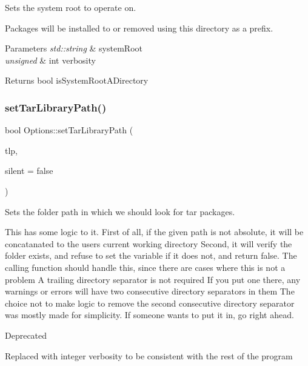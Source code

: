 Sets the system root to operate on. 

Packages will be installed to or removed using this directory as a prefix.


\begin{DoxyParams}{Parameters}
{\em std\+::string} & system\+Root \\
\hline
{\em unsigned} & int verbosity\\
\hline
\end{DoxyParams}
\begin{DoxyReturn}{Returns}
bool is\+System\+Root\+A\+Directory 
\end{DoxyReturn}
\mbox{\label{classOptions_a938d840685d739466bfb36759b7fcb43}} 
\subsubsection{\texorpdfstring{setTarLibraryPath()}{setTarLibraryPath()}\hspace{0.1cm}{\footnotesize\ttfamily [1/2]}}
{\footnotesize\ttfamily bool Options\+::set\+Tar\+Library\+Path (\begin{DoxyParamCaption}\item[{std\+::string}]{tlp,  }\item[{bool}]{silent = {\ttfamily false} }\end{DoxyParamCaption})}



Sets the folder path in which we should look for tar packages. 

This has some logic to it. First of all, if the given path is not absolute, it will be concatanated to the user\textquotesingle{}s current working directory Second, it will verify the folder exists, and refuse to set the variable if it does not, and return false. The calling function should handle this, since there are cases where this is not a problem A trailing directory separator is not required If you put one there, any warnings or errors will have two consecutive directory separators in them The choice not to make logic to remove the second consecutive directory separator was mostly made for simplicity. If someone wants to put it in, go right ahead.

\begin{DoxyRefDesc}{Deprecated}
\item[\mbox{\hyperlink{deprecated__deprecated000012}{Deprecated}}]Replaced with integer verbosity to be consistent with the rest of the program\end{DoxyRefDesc}



